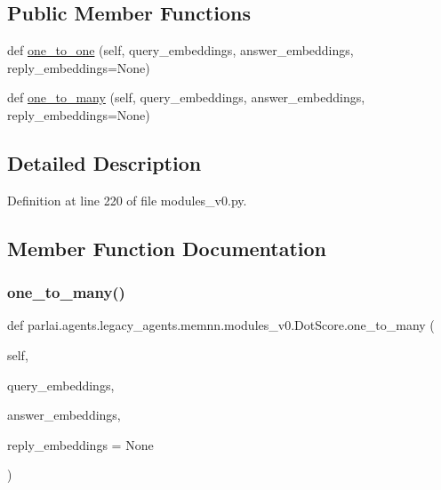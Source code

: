 \subsection*{Public Member Functions}
\begin{DoxyCompactItemize}
\item 
def \hyperlink{classparlai_1_1agents_1_1legacy__agents_1_1memnn_1_1modules__v0_1_1DotScore_acf84cd9ea66c02103aae3b3ddb78c59e}{one\+\_\+to\+\_\+one} (self, query\+\_\+embeddings, answer\+\_\+embeddings, reply\+\_\+embeddings=None)
\item 
def \hyperlink{classparlai_1_1agents_1_1legacy__agents_1_1memnn_1_1modules__v0_1_1DotScore_a3ce27eeeca048e948546729199007d35}{one\+\_\+to\+\_\+many} (self, query\+\_\+embeddings, answer\+\_\+embeddings, reply\+\_\+embeddings=None)
\end{DoxyCompactItemize}


\subsection{Detailed Description}


Definition at line 220 of file modules\+\_\+v0.\+py.



\subsection{Member Function Documentation}
\mbox{\label{classparlai_1_1agents_1_1legacy__agents_1_1memnn_1_1modules__v0_1_1DotScore_a3ce27eeeca048e948546729199007d35}} 
\subsubsection{\texorpdfstring{one\+\_\+to\+\_\+many()}{one\_to\_many()}}
{\footnotesize\ttfamily def parlai.\+agents.\+legacy\+\_\+agents.\+memnn.\+modules\+\_\+v0.\+Dot\+Score.\+one\+\_\+to\+\_\+many (\begin{DoxyParamCaption}\item[{}]{self,  }\item[{}]{query\+\_\+embeddings,  }\item[{}]{answer\+\_\+embeddings,  }\item[{}]{reply\+\_\+embeddings = {\ttfamily None} }\end{DoxyParamCaption})}




